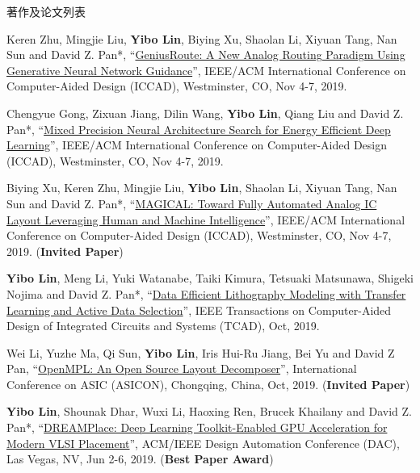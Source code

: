 \begin{rSection}{著作及论文列表}
\begin{description}[font=\normalfont, rightmargin=2em]
{}
            

\item[{[C47]}]{
        Keren Zhu, Mingjie Liu, \textbf{Yibo Lin}, Biying Xu, Shaolan Li, Xiyuan Tang, Nan Sun and David Z. Pan*, 
    ``\href{https://doi.org/10.1109/ICCAD45719.2019.8942164}{GeniusRoute: A New Analog Routing Paradigm Using Generative Neural Network Guidance}'', 
    IEEE/ACM International Conference on Computer-Aided Design (ICCAD), Westminster, CO, Nov 4-7, 2019.
    
}
            

\item[{[C46]}]{
        Chengyue Gong, Zixuan Jiang, Dilin Wang, \textbf{Yibo Lin}, Qiang Liu and David Z. Pan*, 
    ``\href{https://doi.org/10.1109/ICCAD45719.2019.8942147}{Mixed Precision Neural Architecture Search for Energy Efficient Deep Learning}'', 
    IEEE/ACM International Conference on Computer-Aided Design (ICCAD), Westminster, CO, Nov 4-7, 2019.
    
}
            

\item[{[C45]}]{
        Biying Xu, Keren Zhu, Mingjie Liu, \textbf{Yibo Lin}, Shaolan Li, Xiyuan Tang, Nan Sun and David Z. Pan*, 
    ``\href{https://doi.org/10.1109/ICCAD45719.2019.8942060}{MAGICAL: Toward Fully Automated Analog IC Layout Leveraging Human and Machine Intelligence}'', 
    IEEE/ACM International Conference on Computer-Aided Design (ICCAD), Westminster, CO, Nov 4-7, 2019.
    (\textbf{Invited Paper})
}
            

\item[{[J44]}]{
        \textbf{Yibo Lin}, Meng Li, Yuki Watanabe, Taiki Kimura, Tetsuaki Matsunawa, Shigeki Nojima and David Z. Pan*, 
    ``\href{https://doi.org/10.1109/TCAD.2018.2864251}{Data Efficient Lithography Modeling with Transfer Learning and Active Data Selection}'', 
    IEEE Transactions on Computer-Aided Design of Integrated Circuits and Systems (TCAD), Oct, 2019.
    
}
            

\item[{[C43]}]{
        Wei Li, Yuzhe Ma, Qi Sun, \textbf{Yibo Lin}, Iris Hui-Ru Jiang, Bei Yu and David Z Pan, 
    ``\href{https://arxiv.org/abs/1809.07554}{OpenMPL: An Open Source Layout Decomposer}'', 
    International Conference on ASIC (ASICON), Chongqing, China, Oct, 2019.
    (\textbf{Invited Paper})
}
            

\item[{[C42]}]{
        \textbf{Yibo Lin}, Shounak Dhar, Wuxi Li, Haoxing Ren, Brucek Khailany and David Z. Pan*, 
    ``\href{https://doi.org/10.1145/3316781.3317803}{DREAMPlace: Deep Learning Toolkit-Enabled GPU Acceleration for Modern VLSI Placement}'', 
    ACM/IEEE Design Automation Conference (DAC), Las Vegas, NV, Jun 2-6, 2019.
    (\textbf{Best Paper Award})
}
            


\end{description}
\end{rSection}
